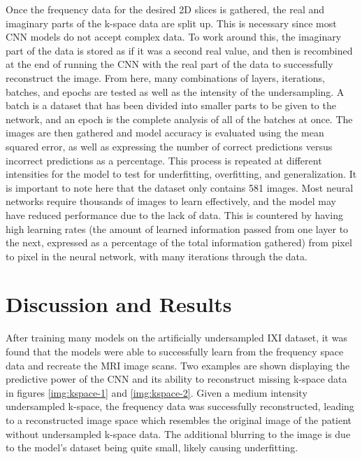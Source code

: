 \documentclass[14pt]{extreport}
\begin{document}
        Once the frequency data for the desired 2D slices is gathered, the real and imaginary parts of the k-space data are split up. This is necessary since most CNN models do not accept complex data. To work around this, the imaginary part of the data is stored as if it was a second real value, and then is recombined at the end of running the CNN with the real part of the data to successfully reconstruct the image. From here, many combinations of layers, iterations, batches, and epochs are tested as well as the intensity of the undersampling. A batch is a dataset that has been divided into smaller parts to be given to the network, and an epoch is the complete analysis of all of the batches at once. The images are then gathered and model accuracy is evaluated using the mean squared error, as well as expressing the number of correct predictions versus incorrect predictions as a percentage. This process is repeated at different intensities for the model to test for underfitting, overfitting, and generalization. It is important to note here that the dataset only contains 581 images. Most neural networks require thousands of images to learn effectively, and the model may have reduced performance due to the lack of data. This is countered by having high learning rates (the amount of learned information passed from one layer to the next, expressed as a percentage of the total information gathered) from pixel to pixel in the neural network, with many iterations through the data.

    \section*{Discussion and Results}
        After training many models on the artificially undersampled IXI dataset, it was found that the models were able to successfully learn from the frequency space data and recreate the MRI image scans. Two examples are shown displaying the predictive power of the CNN and its ability to reconstruct missing k-space data in figures \ref{img:kspace-1} and \ref{img:kspace-2}. Given a medium intensity undersampled k-space, the frequency data was successfully reconstructed, leading to a reconstructed image space which resembles the original image of the patient without undersampled k-space data. The additional blurring to the image is due to the model's dataset being quite small, likely causing underfitting.
\end{document}
